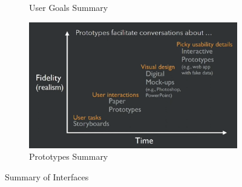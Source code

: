\documentclass[a4paper]{article}
\begin{document}
\begin{itemize}
\begin{figure}[H]
\begin{subfigure}[b]{0.45\textwidth}
            \caption{User Goals Summary}
            \label{fig:SE-user-goal-summary}
        \end{subfigure}
        \hfill
        \begin{subfigure}[b]{0.45\textwidth}
            \includegraphics[width=\textwidth]{Degree/static/SE_prototype_summary.png}
            \caption{Prototypes Summary}
            \label{fig:SE-prototype-summary}
        \end{subfigure}
        \caption{Summary of Interfaces}
    \end{figure}
\end{itemize}
\end{document}
